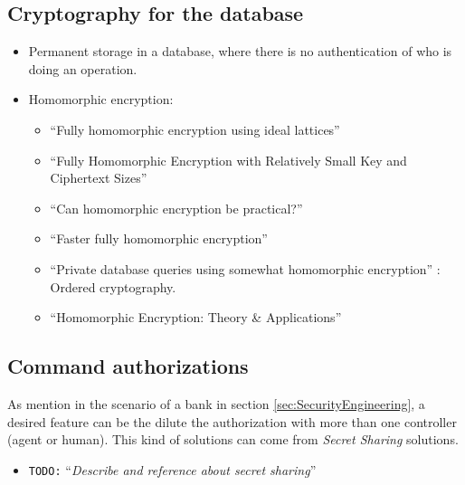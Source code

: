 \documentclass[10pt,a4paper,twoside]{llncs}
\newcommand{\todo}[1]{\texttt{\color{red}TODO:} ``\emph{#1}''}
\begin{document}
\subsection{Cryptography for the database}
    \begin{itemize}
        \item Permanent storage in a database, where there is no authentication of who is doing an operation.
        \item Homomorphic encryption:
        \begin{itemize}
            \item ``Fully homomorphic encryption using ideal lattices'' \cite{Gentry:2009:FHE:1536414.1536440}
            \item ``Fully Homomorphic Encryption with Relatively Small Key and Ciphertext Sizes''\cite{SmartVecauteren10}
            \item ``Can homomorphic encryption be practical?'' \cite{Naehrig:2011:HEP:2046660.2046682}
            \item ``Faster fully homomorphic encryption'' \cite{stehle2010faster}
            \item ``Private database queries using somewhat homomorphic encryption'' \cite{iacr422}: Ordered cryptography.
            \item ``Homomorphic Encryption: Theory \& Applications'' \cite{Jaydip2013}
        \end{itemize}

    \end{itemize}

\subsection{Command authorizations}

As mention in the scenario of a bank in section \ref{sec:SecurityEngineering}, a desired feature can be the dilute the authorization with more than one controller (agent or human). This kind of solutions can come from \emph{Secret Sharing} solutions.

\begin{itemize}
    \item \todo{Describe and reference about secret sharing}
\end{itemize}
\end{document}
